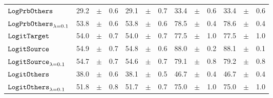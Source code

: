 \documentclass[../main.tex]{subfiles}
\begin{document}
\begin{tabular}{lrrrrrrrrrrrr}
$\mathtt{LogPrbOthers}_{}$              & 29.2                            & $\pm$                                        & 0.6                        & 29.1                                                                                 & $\pm$ & 0.7                                & 33.4  & $\pm$ & 0.6             & 33.4  & $\pm$ & 0.6                           \\
$\mathtt{LogPrbOthers}_{\lambda=0.1}$   & 53.8                            & $\pm$                                        & 0.6                        & 53.8                                                                                   & $\pm$ & 0.6                                & 78.5  & $\pm$ & 0.4             & 78.6  & $\pm$ & 0.4                           \\
\rowcolor{lightgray}
$\mathtt{LogitTarget}$                 & 54.0                            & $\pm$                                        & 0.7                        & 54.0                                                                                     & $\pm$ & 0.7                                & 77.5  & $\pm$ & 1.0             & 77.5  & $\pm$ & 1.0                           \\
\rowcolor{lightgray}
$\mathtt{LogitSource}_{}$               & 54.9                            & $\pm$                                        & 0.7                        & 54.8                                                                                   & $\pm$ & 0.6                                & 88.0  & $\pm$ & 0.2             & 88.1  & $\pm$ & 0.1                           \\
$\mathtt{LogitSource}_{\lambda=0.1}$    & 54.7                            & $\pm$                                        & 0.7                        & 54.6                                                                                   & $\pm$ & 0.7                                & 79.1  & $\pm$ & 0.8             & 79.2  & $\pm$ & 0.8                           \\
$\mathtt{LogitOthers}_{}$               & 38.0                            & $\pm$                                        & 0.6                        & 38.1                                                                                 & $\pm$ & 0.5                                & 46.7  & $\pm$ & 0.4             & 46.7  & $\pm$ & 0.4                           \\
$\mathtt{LogitOthers}_{\lambda=0.1}$    & 51.8                            & $\pm$                                        & 0.8                        & 51.7                                                                                   & $\pm$ & 0.7                                & 75.0  & $\pm$ & 1.0             & 75.0  & $\pm$ & 1.0                           \\

\end{tabular}
\end{document}
